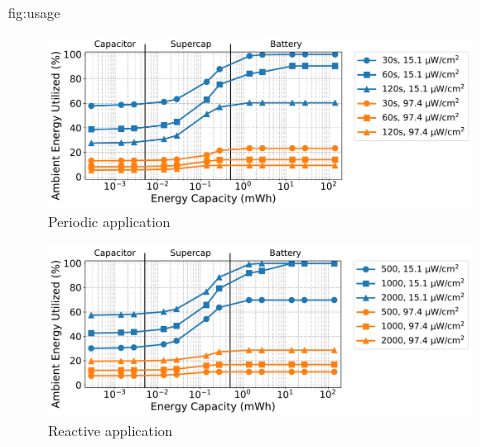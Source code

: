\begin{definefigure*}{fig:usage}
  \centering
  \begin{subfigure}{0.49\textwidth}
    \centering
    \includegraphics[width=0.9\linewidth]{figs/capacity/sense_and_send/usage_vs_secondary_size}
    \caption{Periodic application}
    \label{fig:usage:sensesec}
  \end{subfigure}
  \begin{subfigure}{0.49\textwidth}
    \centering
    \includegraphics[width=0.9\linewidth]{figs/capacity/door_occupancy/usage_vs_secondary_size}
    \caption{Reactive application}
    \label{fig:usage:eventsec}
  \end{subfigure}
  \caption{\normalfont Ambient energy utilization
    as a function of idealized secondary storage capacity for different
    harvesting scenarios and workloads. The harvesting scenarios and workloads
    are described in \cref{sec:overview} and \cref{tab:capacity:rep}.  The x-axis is
    split by energy capacities possible with capacitors, supercapacitors, and
    batteries. The upper extents of capacity for (super)capacitors represent
    ten 100\,\si{\micro\farad} tantalum capacitors~\cite{tantalumDatasheet}, and one
    large 220\,mF supercapacitor~\cite{murataCap}. Larger capacitors exist, but
    are not appropriate for use on a small sensor node.  As energy storage increases, the harvestable energy used in
    the application also increases, implying
    increased application performance.  Some scenarios, such as the periodic
    30\,s, 15.1\,\uW/cm\textsuperscript{2} case, reach 100\% utilization at
    high secondary capacities indicating that available energy is not
    sufficient to meet the application's requirements.
    Generally, for both workloads and irradiance traces, from
    the smallest to largest capacity simulated, we see a 1.4-2.3x increase in
    utilized energy.
    }
\end{definefigure*}

